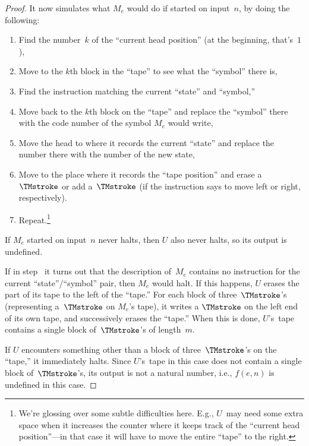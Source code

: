 \documentclass[../../../include/open-logic-section]{subfiles}
\begin{document}
\begin{proof}
  It now simulates what $M_e$ would do if started on input~$n$, by
  doing the following:
  \begin{enumerate}
    \item Find the number~$k$ of the ``current head position'' (at the
    beginning, that's~$1$),
    \item Move to the $k$th block in the ``tape'' to see what the
    ``symbol'' there is,
    \item{}%
    Find the instruction matching the current ``state'' and
    ``symbol,''
    \item Move back to the $k$th block on the ``tape'' and replace the
    ``symbol'' there with the code number of the symbol $M_e$ would
    write,
    \item Move the head to where it records the current ``state'' and
    replace the number there with the number of the new state,
    \item Move to the place where it records the ``tape position'' and
    erase a~$\TMstroke$ or add a~$\TMstroke$ (if the instruction says
    to move left or right, respectively).
    \item Repeat.\footnote{We're glossing over some subtle
    difficulties here. E.g., $U$~may need some extra space when it
    increases the counter where it keeps track of the ``current head
    position''---in that case it will have to move the entire ``tape''
    to the right.}
  \end{enumerate}
  If $M_e$ started on input~$n$ never halts, then $U$ also never
  halts, so its output is undefined.

  If in step~ it turns out that the description
  of~$M_e$ contains no instruction for the current
  ``state''/``symbol'' pair, then $M_e$ would halt. If this happens,
  $U$ erases the part of its tape to the left of the ``tape.'' For
  each block of three~$\TMstroke$'s (representing a~$\TMstroke$ on
  $M_e$'s tape), it writes a $\TMstroke$ on the left end of its own
  tape, and successively erases the ``tape.'' When this is done,
  $U$'s~tape contains a single block of~$\TMstroke$'s of length~$m$.
  
  If $U$ encounters something other than a block of
  three~$\TMstroke$'s on the ``tape,'' it immediately halts. Since
  $U$'s~tape in this case does not contain a single block
  of~$\TMstroke$'s, its output is not a natural number, i.e., $f(e,n)$
  is undefined in this case.
\end{proof}
\end{document}
